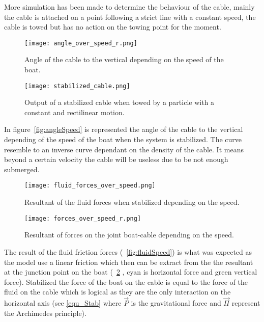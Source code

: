 More simulation has been made to determine the behaviour of the cable, mainly the cable is attached on a point following a strict line with a constant speed, the cable is towed but has no action on the towing point for the moment.

\begin{figure}[H]
\centering
    \begin{minipage}[b]{0.4\textwidth}
    \centering
    \texttt{[image: angle\_over\_speed\_r.png]}
    \caption{Angle of the cable to the vertical depending on the speed of the boat.}
    \label{fig:angleSpeed}
    \end{minipage}
    \hfill
    \begin{minipage}[b]{0.45\textwidth}
    \centering
    \texttt{[image: stabilized\_cable.png]}
    \caption{Output of a stabilized cable when towed by a particle with a constant and rectilinear motion.}
    \label{fig:stabCable}
    \end{minipage}
\end{figure}

In figure~\ref{fig:angleSpeed} is represented the angle of the cable to the vertical depending of the speed of the 
boat when the system is stabilized. The curve resemble to an inverse curve dependant on the density of the cable.
It means beyond a certain velocity the cable will be useless due to be not enough submerged.

\begin{figure}[H]
\centering
    \begin{minipage}[b]{0.4\textwidth}
    \centering
    \texttt{[image: fluid\_forces\_over\_speed.png]}
    \caption{Resultant of the fluid forces when stabilized depending on the speed.}
    \label{fig:fluidSpeed}
    \end{minipage}
    \hfill
    \begin{minipage}[b]{0.45\textwidth}
    \centering
    \texttt{[image: forces\_over\_speed\_r.png]}
    \caption{Resultant of forces on the joint boat-cable depending on the speed.}
    \label{fig:forceSpeed}
    \end{minipage}
\end{figure}

The result of the fluid friction forces (~\ref{fig:fluidSpeed}) is what was expected as the model use a linear friction which then can be extract from the the resultant at the junction point on the boat (~\ref{fig:forceSpeed} , cyan is horizontal force and green vertical force). Stabilized the force of the boat on the cable is equal to the force of the fluid on the cable which is logical as they are the only interaction on the horizontal axis (see \eqref{equ_Stab} where $\vec{P}$ is the gravitational force and $\vec{\Pi}$ represent the Archimedes principle).

